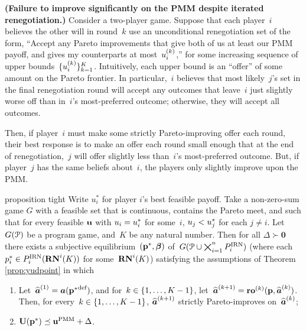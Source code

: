 \documentclass[sigconf]{aamas}
\newcommand{\bestparetopayoffi}{u^*_i}
\newcommand{\bestparetopayoffj}{u^*_j}
\newcommand{\bestparetopayoffone}{u^*_1}
\newcommand{\bestparetopayofftwo}{u^*_2}
\newcommand{\selection}{sel}%
\newcommand{\renegb}{\mathbf{\selection}}
\theoremstyle{definition}
\begin{document}
\begin{exmp}
\label{ex:iterated}
\textbf{(Failure to improve significantly 
on the PMM despite iterated renegotiation.)} 
Consider a two-player game.
Suppose that each player~$i$
believes the other will
in round~${k}$
use an
unconditional
renegotiation set of the form, 
``Accept any Pareto improvements
that give both of us at least our PMM payoff, 
and gives my counterparts at most~$u_i^{(k)}$,''
for some increasing sequence of upper bounds~$\{u_i^{(k)}\}_{{k}=1}^{{K}}$.
Intuitively, each upper bound is an ``offer'' of some amount on
the Pareto frontier.
In particular,~$i$ believes
that most likely~$j$'s set in the final renegotiation
round will accept any outcomes
that leave~$i$ just slightly worse off
than in~$i$'s most-preferred outcome;
otherwise, they will accept all outcomes.

Then, if player~$i$
must make some strictly Pareto-improving offer each round,
their
best response
is to make an offer each round
small enough
that at the end of renegotiation,~$j$
will offer slightly less than~$i$'s
most-preferred outcome.
But, if player~$j$ has the same beliefs about~$i$,
the players only slightly improve
upon the PMM.
\end{exmp}

\begin{restatable}
{proposition}
{tight}
\label{proposition:inefficiency}
Write $\bestparetopayoffi$ for
player $i$'s best feasible
payoff. Take a 
non-zero-sum game $G$
with a
feasible set that is continuous, 
contains the Pareto meet, and 
such that for every 
feasible $\textbf{u}$ with 
$\payi = \bestparetopayoffi$ for some~$i$, 
$\payj < \bestparetopayoffj$ for each 
$j \neq i$. 
Let~$G(\mathcal{P})$
be a program
game,
and~${K}$
be any natural number.
Then for all $\Delta \succ \mathbf{0}$ 
there exists a subjective equilibrium~$(\textbf{p}^*, \boldsymbol{\beta})$
of~$G(\mathcal{P} \cup \bigtimes_{i=1}^{{n}} P_i^{\textnormal{IRN}})$
(where each~$p_i^* \in P_i^{\textnormal{IRN}}(\mathbf{RN}^{i}({K}))$
for some~$\mathbf{RN}^{i}({K})$) satisfying the assumptions of Theorem \ref{prop:yudpoint}
in which 
\begin{enumerate}
    \item
    Let~$\widehat{\boldsymbol{a}}^{(1)} = \boldsymbol{a}({\textbf{p}^*}^{\textnormal{def}})$,
    and for~${k} \in \{1,\dots,{K}-1\}$,
    let~$\widehat{\boldsymbol{a}}^{(k+1)} = \mathbf{ro}^{(k)}(\textbf{p}, \widehat{\boldsymbol{a}}^{(k)})$.
    Then, for
    every~${k} \in \{1,\dots,{K}-1\}$,
    $\widehat{\boldsymbol{a}}^{(k+1)}$
    strictly Pareto-improves
    on~$\widehat{\boldsymbol{a}}^{(k)}$;
    \item $\textbf{U}(\textbf{p}^*) \preceq
    \textbf{u}^{\textnormal{PMM}} + \Delta$.
\end{enumerate}
\end{restatable}
\end{document}
